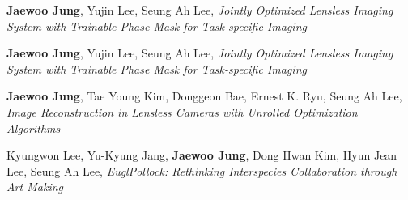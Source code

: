 \documentclass[a4paper,12pt]{memoir} %
\begin{document}
\Sep


\clearpage %

\userinformation %

\framebreak %


\Sep %




{\textbf{Jaewoo Jung}, Yujin Lee, Seung Ah Lee, \textit{Jointly Optimized Lensless Imaging System with Trainable Phase Mask for Task-specific Imaging}}



{\textbf{Jaewoo Jung}, Yujin Lee, Seung Ah Lee, \textit{Jointly Optimized Lensless Imaging System with Trainable Phase Mask for Task-specific Imaging}}


{\textbf{Jaewoo Jung}, Tae Young Kim, Donggeon Bae, Ernest K. Ryu, Seung Ah Lee, \textit{Image Reconstruction in Lensless Cameras with Unrolled Optimization Algorithms}}



{Kyungwon Lee, Yu-Kyung Jang, \textbf{Jaewoo Jung}, Dong Hwan Kim, Hyun Jean Lee, Seung Ah Lee, \textit{EuglPollock: Rethinking Interspecies Collaboration through Art Making}}
\end{document}
